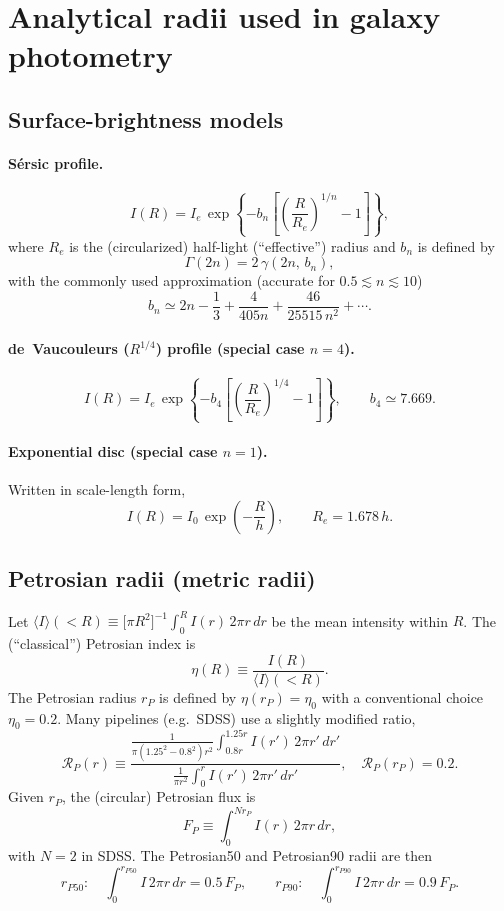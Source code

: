 \documentclass[12pt]{article}
\begin{document}
\section*{Analytical radii used in galaxy photometry}

\subsection*{Surface-brightness models}

\paragraph{Sérsic profile.}
\[
I(R)=I_e\,
\exp\!\left\{-b_n\!\left[\left(\frac{R}{R_e}\right)^{1/n}-1\right]\right\},
\]
where $R_e$ is the (circularized) half-light (``effective'') radius and $b_n$ is defined by
\[
\Gamma(2n)=2\,\gamma\!\left(2n,\,b_n\right),
\]
with the commonly used approximation (accurate for $0.5\!\lesssim\! n\!\lesssim\!10$)
\[
b_n \simeq 2n-\frac{1}{3}+\frac{4}{405n}+\frac{46}{25515\,n^2}+\cdots .
\]

\paragraph{de~Vaucouleurs ($R^{1/4}$) profile (special case $n=4$).}
\[
I(R)=I_e\,
\exp\!\left\{-b_4\!\left[\left(\frac{R}{R_e}\right)^{1/4}-1\right]\right\},\qquad
b_4\simeq 7.669 .
\]

\paragraph{Exponential disc (special case $n=1$).}
Written in scale-length form,
\[
I(R)=I_0\,\exp\!\left(-\frac{R}{h}\right),\qquad
R_e = 1.678\,h .
\]

\subsection*{Petrosian radii (metric radii)}

Let $\langle I\rangle(<R)\equiv \big[\pi R^2\big]^{-1}\!\int_0^R I(r)\,2\pi r\,dr$ be the mean intensity within $R$.
The (``classical'') Petrosian index is
\[
\eta(R)\equiv \frac{I(R)}{\langle I\rangle(<R)}.
\]
The Petrosian radius $r_P$ is defined by $\eta(r_P)=\eta_0$ with a conventional choice $\eta_0=0.2$.
Many pipelines (e.g.\ SDSS) use a slightly modified ratio,
\[
\mathcal{R}_P(r)\equiv
\frac{\displaystyle \frac{1}{\pi(1.25^2-0.8^2)r^2}\int_{0.8r}^{1.25r} I(r')\,2\pi r'\,dr'}
     {\displaystyle \frac{1}{\pi r^2}\int_{0}^{r}         I(r')\,2\pi r'\,dr'},
\quad \mathcal{R}_P(r_P)=0.2 .
\]
Given $r_P$, the (circular) Petrosian flux is
\[
F_P \equiv \int_{0}^{N r_P} I(r)\,2\pi r\,dr,
\]
with $N=2$ in SDSS. The Petrosian50 and Petrosian90 radii are then
\[
r_{P50}:\quad \int_{0}^{r_{P50}}\! I\,2\pi r\,dr = 0.5\,F_P,\qquad
r_{P90}:\quad \int_{0}^{r_{P90}}\! I\,2\pi r\,dr = 0.9\,F_P.
\]
\end{document}
